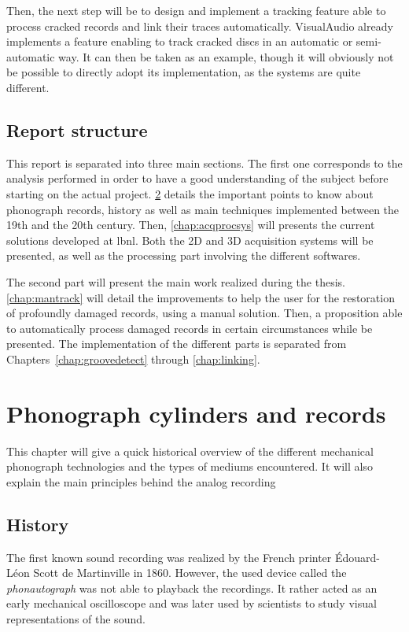 Then, the next step will be to design and implement a tracking feature able to process cracked records and link their traces automatically. VisualAudio already implements a feature enabling to track cracked discs in an automatic or semi-automatic way. It can then be taken as an example, though it will obviously not be possible to directly adopt its implementation, as the systems are quite different.

\section{Report structure}

This report is separated into three main sections. The first one corresponds to the analysis performed in order to have a good understanding of the subject before starting on the actual project. \ref{chap:phonorecords} details the important points to know about phonograph records, history as well as main techniques implemented between the 19th and the 20th century. Then, \ref{chap:acqprocsys} will presents the current solutions developed at \gls{lbnl}. Both the 2D and 3D acquisition systems will be presented, as well as the processing part involving the different softwares.

The second part will present the main work realized during the thesis. \ref{chap:mantrack} will detail the improvements to help the user for the restoration of profoundly damaged records, using a manual solution. Then, a proposition able to automatically process damaged records in certain circumstances while be presented. The implementation of the different parts is separated from Chapters~\ref{chap:groovedetect} through \ref{chap:linking}.


\chapter{Phonograph cylinders and records}
\label{chap:phonorecords}

This chapter will give a quick historical overview of the different mechanical phonograph technologies and the types of mediums encountered. It will also explain the main principles behind the analog recording

\section{History}

The first known sound recording was realized by the French printer Édouard-Léon Scott de Martinville in 1860. However, the used device called the \emph{phonautograph} was not able to playback the recordings. It rather acted as an early mechanical oscilloscope and was later used by scientists to study visual representations of the sound.

